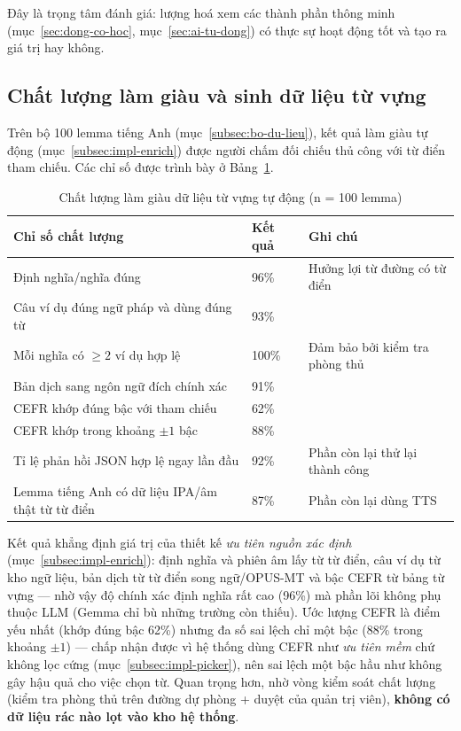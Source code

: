 Đây là trọng tâm đánh giá: lượng hoá xem các thành phần thông minh
(mục~\ref{sec:dong-co-hoc}, mục~\ref{sec:ai-tu-dong}) có thực sự hoạt động tốt
và tạo ra giá trị hay không.

\subsection{Chất lượng làm giàu và sinh dữ liệu từ vựng}
\label{subsec:eval-enrich}

Trên bộ 100 lemma tiếng Anh (mục~\ref{subsec:bo-du-lieu}), kết quả làm giàu tự
động (mục~\ref{subsec:impl-enrich}) được người chấm đối chiếu thủ công với từ
điển tham chiếu. Các chỉ số được trình bày ở Bảng~\ref{tab:eval-enrich}.

\begin{table}[h]
  \centering
  \small
  \renewcommand{\arraystretch}{1.3}
  \begin{tabular}{|p{8.4cm}|p{2.6cm}|p{2.6cm}|}
    \hline
    \textbf{Chỉ số chất lượng} & \textbf{Kết quả} & \textbf{Ghi chú} \\
    \hline
    Định nghĩa/nghĩa đúng & 96\% & Hưởng lợi từ đường có từ điển \\
    \hline
    Câu ví dụ đúng ngữ pháp và dùng đúng từ & 93\% & \\
    \hline
    Mỗi nghĩa có $\ge 2$ ví dụ hợp lệ & 100\% & Đảm bảo bởi kiểm tra phòng thủ \\
    \hline
    Bản dịch sang ngôn ngữ đích chính xác & 91\% & \\
    \hline
    CEFR khớp đúng bậc với tham chiếu & 62\% & \\
    \hline
    CEFR khớp trong khoảng $\pm 1$ bậc & 88\% & \\
    \hline
    Tỉ lệ phản hồi JSON hợp lệ ngay lần đầu & 92\% & Phần còn lại thử lại thành công \\
    \hline
    Lemma tiếng Anh có dữ liệu IPA/âm thật từ từ điển & 87\% & Phần còn lại dùng TTS \\
    \hline
  \end{tabular}
  \caption{Chất lượng làm giàu dữ liệu từ vựng tự động (n = 100 lemma)}
  \label{tab:eval-enrich}
\end{table}

Kết quả khẳng định giá trị của thiết kế \textit{ưu tiên nguồn xác định}
(mục~\ref{subsec:impl-enrich}): định nghĩa và phiên âm lấy từ từ điển, câu ví
dụ từ kho ngữ liệu, bản dịch từ từ điển song ngữ/OPUS-MT và bậc CEFR từ bảng
từ vựng --- nhờ vậy độ chính xác định nghĩa rất cao (96\%) mà phần lõi không
phụ thuộc LLM (Gemma chỉ bù những trường còn thiếu). Ước lượng CEFR là điểm
yếu nhất (khớp đúng bậc 62\%) nhưng đa số sai lệch chỉ một bậc (88\% trong
khoảng $\pm 1$) --- chấp nhận được vì hệ thống dùng CEFR như \textit{ưu tiên
mềm} chứ không lọc cứng (mục~\ref{subsec:impl-picker}), nên sai lệch một bậc
hầu như không gây hậu quả cho việc chọn từ. Quan trọng hơn, nhờ vòng kiểm soát
chất lượng (kiểm tra phòng thủ trên đường dự phòng + duyệt của quản trị viên),
\textbf{không có dữ liệu rác nào lọt vào kho hệ thống}.

